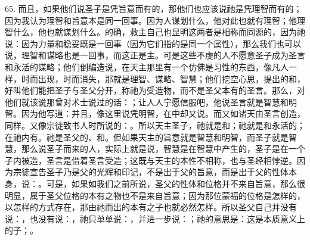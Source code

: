 65. 而且，如果他们说圣子是凭旨意而有的，那他们也应该说祂是凭理智而有的；因为我认为理智和旨意本是同一回事。因为人谋划什么，他对此也就有理智；他理智什么，他也就谋划什么。的确，救主自己也显明这两者是相称而同源的，因为祂说：因为力量和稳妥既是一回事（因为它们指的是同一个属性），那么我们也可以说，理智和谋略也是一回事，而这正是主。可是这些不虔的人不愿意圣子成为圣言和永活的谋略；他们倒编造说，在天主那里有一个仿佛是习性的东西，像凡人一样，时而出现，时而消失，那就是理智、谋略、智慧；他们挖空心思，提出的和，好叫他们能把圣子与圣父分开，称祂为受造物，而不是圣父本有的圣言。那么，对他们就该说那曾对术士说过的话：；让人人宁愿信服吧，他说圣言就是智慧和明智。因为他写道：并且，像这里说凭明智，在中却又说。而又如诸天由圣言创造，同样。又像宗徒致书人时所说的：。所以天主圣子，祂就是和；祂就是和永活的；在祂内有。祂是圣父的、和。但如果天主的旨意就是智慧和明智，而圣子就是智慧，那么说圣子而来的人，实际上就是说，智慧是在智慧中产生的，圣子是在一个子内被造，圣言是借着圣言受造；这既与天主的本性不相称，也与圣经相悖逆。因为宗徒宣告圣子乃是父的光辉和印记，不是出于父的旨意，而是出于父的性体本身，说：。可是，如果如我们之前所说，圣父的性体和位格并不来自旨意，那么很明显，属于圣父位格的本有之物也不是来自旨意；因为那位蒙福的位格是怎样的，以怎样的方式存在，那由祂而出的本有之子也就必然怎样。所以圣父自己并没有说：，也没有说：，祂只单单说：，并进一步说：；祂的意思是：这是本质意义上的子；。\par

